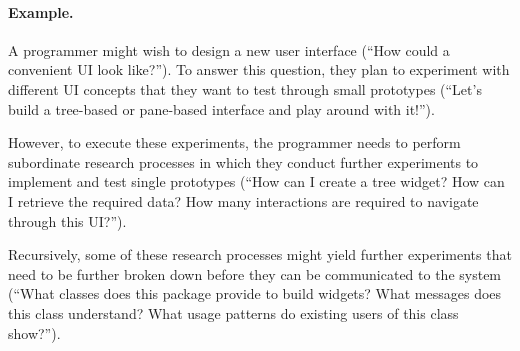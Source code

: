 \begin{example}
	\paragraph{Example.}
	A programmer might wish to design a new user interface (``How could a convenient UI look like?'').
	To answer this question, they plan to experiment with different UI concepts that they want to test through small prototypes (``Let's build a tree-based or pane-based interface and play around with it!'').

	However, to execute these experiments, the programmer needs to perform subordinate research processes in which they conduct further experiments to implement and test single prototypes (``How can I create a tree widget? How can I retrieve the required data? How many interactions are required to navigate through this UI?'').

	Recursively, some of these research processes might yield further experiments that need to be further broken down before they can be communicated to the system (``What classes does this package provide to build widgets? What messages does this class understand? What usage patterns do existing users of this class show?'').
\end{example}
